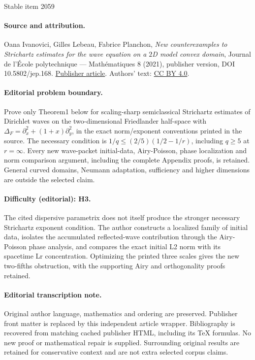 \documentclass[11pt]{article}
\theoremstyle{plain}
\theoremstyle{definition}
\begin{document}
\begin{center}{\Large Stable item 2059}\end{center}
\paragraph{Source and attribution.}
Oana Ivanovici, Gilles Lebeau, Fabrice Planchon, \emph{New counterexamples to Strichartz estimates for the wave equation on a $2$D model convex domain}, Journal de l’École polytechnique — Mathématiques 8 (2021), publisher version, DOI 10.5802/jep.168. \href{https://jep.centre-mersenne.org/articles/10.5802/jep.168/}{Publisher article}. Authors' text: \href{https://creativecommons.org/licenses/by/4.0/}{CC BY 4.0}.
\paragraph{Editorial problem boundary.}
Prove only Theorem1 below for scaling-sharp semiclassical Strichartz estimates of Dirichlet waves on the two-dimensional Friedlander half-space with \(\Delta_F=\partial_x^2+(1+x)\partial_y^2\), in the exact norm/exponent conventions printed in the source. The necessary condition is \(1/q\le(2/5)(1/2-1/r)\), including \(q\ge5\) at \(r=\infty\). Every new wave-packet initial-data, Airy-Poisson, phase localization and norm comparison argument, including the complete Appendix proofs, is retained. General curved domains, Neumann adaptation, sufficiency and higher dimensions are outside the selected claim.
\paragraph{Difficulty (editorial): H3.}
The cited dispersive parametrix does not itself produce the stronger necessary Strichartz exponent condition. The author constructs a localized family of initial data, isolates the accumulated reflected-wave contribution through the Airy-Poisson phase analysis, and compares the exact initial L2 norm with its spacetime Lr concentration. Optimizing the printed three scales gives the new two-fifths obstruction, with the supporting Airy and orthogonality proofs retained.
\paragraph{Editorial transcription note.}
Original author language, mathematics and ordering are preserved. Publisher front matter is replaced by this independent article wrapper. Bibliography is recovered from matching cached publisher HTML, including its TeX formulas. No new proof or mathematical repair is supplied. Surrounding original results are retained for conservative context and are not extra selected corpus claims.
\clearpage
\end{document}
